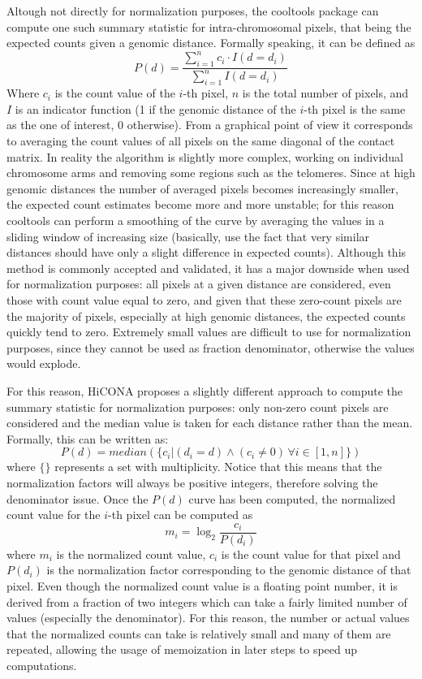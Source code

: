 Altough not directly for normalization purposes, the cooltools package \cite{cooltools2022} can compute one such summary statistic for intra-chromosomal pixels, that being the expected counts given a genomic distance. Formally speaking, it can be defined as
$$P\left(d\right) = \frac{\sum_{i=1}^n c_i \cdot I(d = d_i)}{\sum_{i=1}^n I(d = d_i)}$$
Where $c_i$ is the count value of the $i$-th pixel, $n$ is the total number of pixels, and $I$ is an indicator function (1 if the genomic distance of the $i$-th pixel is the same as the one of interest, 0 otherwise). From a graphical point of view it corresponds to averaging the count values of all pixels on the same diagonal of the contact matrix. In reality the algorithm is slightly more complex, working on individual chromosome arms and removing some regions such as the telomeres. Since at high genomic distances the number of averaged pixels becomes increasingly smaller, the expected count estimates become more and more unstable; for this reason cooltools can perform a smoothing of the curve by averaging the values in a sliding window of increasing size (basically, use the fact that very similar distances should have only a slight difference in expected counts). Although this method is commonly accepted and validated, it has a major downside when used for normalization purposes: all pixels at a given distance are considered, even those with count value equal to zero, and given that these zero-count pixels are the majority of pixels, especially at high genomic distances, the expected counts quickly tend to zero. Extremely small values are difficult to use for normalization purposes, since they cannot be used as fraction denominator, otherwise the values would explode. 

For this reason, HiCONA proposes a slightly different approach to compute the summary statistic for normalization purposes: only non-zero count pixels are considered and the median value is taken for each distance rather than the mean. Formally, this can be written as:
$$P\left(d\right) = median(\{c_i|(d_i=d) \land (c_i \neq 0) \, \forall i \in [1,n]\})$$ 
where $\{\}$ represents a set with multiplicity.
Notice that this means that the normalization factors will always be positive integers, therefore solving the denominator issue. Once the $P(d)$ curve has been computed, the normalized count value for the $i$-th pixel can be computed as
$$m_i = \log_2 \frac{c_i}{P(d_i)}$$
where $m_i$ is the normalized count value, $c_i$ is the count value for that pixel and $P(d_i)$ is the normalization factor corresponding to the genomic distance of that pixel. Even though the normalized count value is a floating point number, it is derived from a fraction of two integers which can take a fairly limited number of values (especially the denominator). For this reason, the number or actual values that the normalized counts can take is relatively small and many of them are repeated, allowing the usage of memoization in later steps to speed up computations.
 
